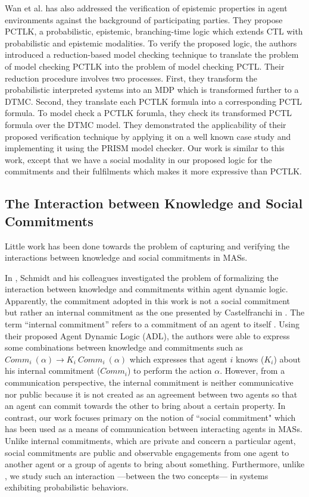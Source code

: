 Wan et al. \cite{Wan2013} has also addressed the verification of
epistemic properties in agent environments  against the background
of participating parties. They propose PCTLK, a probabilistic,
epistemic,  branching-time logic which extends CTL with
probabilistic and epistemic modalities. To verify the proposed
logic, the authors introduced a reduction-based model checking
technique to translate the problem of model checking PCTLK into
the problem of model checking PCTL. Their reduction procedure
involves two processes. First, they transform the probabilistic
interpreted systems into an MDP which is transformed further to a
DTMC. Second, they translate each PCTLK formula into a
corresponding PCTL formula. To model check a PCTLK forumla, they
check its transformed PCTL formula over the DTMC model. They
demonstrated the applicability of their proposed verification
technique by applying it on a well known case study and
implementing it using the PRISM model checker. Our work is similar
to this work, except that we have a social modality in our
proposed logic for the commitments and their fulfilments which
makes it more expressive than PCTLK.


\subsection{The Interaction between Knowledge and Social Commitments}

Little work has been done towards the problem of capturing and verifying the interactions between knowledge and social commitments in MASs.

In \cite{Schmidt2004}, Schmidt and his colleagues investigated the
problem of formalizing the interaction between knowledge and
commitments within agent dynamic logic. Apparently, the commitment
adopted in this work is not a social commitment but rather an
internal commitment as the one presented by Castelfranchi in
\cite{Castelfranchi1995}. The term ``internal commitment'' refers to a commitment of an agent to itself \cite{Singh2008}. Using their proposed Agent Dynamic Logic (ADL), the authors were able to express some combinations between knowledge and commitments such as $Comm_i~(\alpha)\to K_i~Comm_i~(\alpha)$ which expresses that agent $i$ knows ($K_i$) about his
internal commitment ($Comm_i$) to perform the action $\alpha$.
However, from a communication perspective, the internal commitment
is neither communicative nor public because it is not created as
an agreement between two agents so that an agent can commit
towards the other to bring about a certain property. In contrast,
our work focuses primary on the notion of ``social commitment"
\cite{Singh2000} which has been used as a means of communication
between interacting agents in MASs. Unlike internal commitments,
which are private and concern a particular agent, social
commitments are public and observable engagements from one agent
to another agent or a group of agents to bring about something.  Furthermore, unlike \cite{Schmidt2004}, we study such an interaction ---between the two concepts--- in systems exhibiting probabilistic behaviors.

